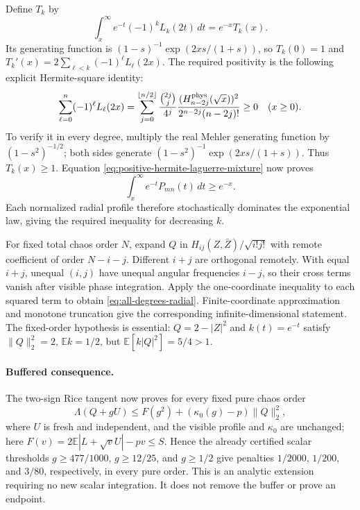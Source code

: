 Define $T_k$ by
\[
 \int_x^\infty e^{-t}(-1)^kL_k(2t)\,dt=e^{-x}T_k(x).
\]
Its generating function is
$(1-s)^{-1}\exp(2xs/(1+s))$, so $T_k(0)=1$ and
$T_k'(x)=2\sum_{\ell<k}(-1)^\ell L_\ell(2x)$.
The required positivity is the following explicit Hermite-square identity:
\[
 \sum_{\ell=0}^n(-1)^\ell L_\ell(2x)
 =\sum_{j=0}^{\lfloor n/2\rfloor}
 \frac{\binom{2j}{j}}{4^j}
 \frac{(H^{\rm phys}_{n-2j}(\sqrt x))^2}
      {2^{n-2j}(n-2j)!}\ge0\quad(x\ge0).
\]
To verify it in every degree, multiply the real Mehler generating
function by $(1-s^2)^{-1/2}$; both sides generate
$(1-s^2)^{-1}\exp(2xs/(1+s))$.
Thus $T_k(x)\ge1$. Equation
\eqref{eq:positive-hermite-laguerre-mixture} now proves
\[
 \int_x^\infty e^{-t}P_{mn}(t)\,dt\ge e^{-x}.
\]
Each normalized radial profile therefore stochastically dominates the
exponential law, giving the required inequality for decreasing $k$.

For fixed total chaos order $N$, expand $Q$ in
$H_{ij}(Z,\bar Z)/\sqrt{i!j!}$ with remote coefficient of order $N-i-j$.
Different $i+j$ are orthogonal remotely. With equal $i+j$, unequal
$(i,j)$ have unequal angular frequencies $i-j$, so their cross terms
vanish after visible phase integration. Apply the one-coordinate
inequality to each squared term to obtain \eqref{eq:all-degrees-radial}.
Finite-coordinate approximation and monotone truncation give the
corresponding infinite-dimensional statement.
The fixed-order hypothesis is essential: $Q=2-|Z|^2$ and $k(t)=e^{-t}$
satisfy $\|Q\|_2^2=2$, $\mathbb Ek=1/2$, but
$\mathbb E[k|Q|^2]=5/4>1$.

\paragraph{Buffered consequence.}
The two-sign Rice tangent now proves for every fixed pure chaos order
\[
 \Lambda(Q+gU)\le F(g^2)+(\kappa_0(g)-p)\|Q\|_2^2,
\]
where $U$ is fresh and independent, and the visible profile and $\kappa_0$
are unchanged; here $F(v)=2\mathbb E|L+\sqrt vU|-pv\le S$.
Hence the already certified scalar thresholds
$g\ge477/1000$, $g\ge12/25$, and $g\ge1/2$ give penalties
$1/2000$, $1/200$, and $3/80$, respectively, in every pure order.
This is an analytic extension requiring no new scalar integration.
It does not remove the buffer or prove an endpoint.

